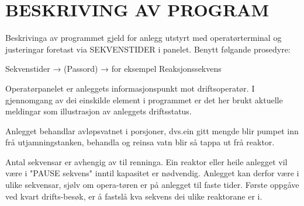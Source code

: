 \newpage
\section{BESKRIVING AV PROGRAM}
Beskrivinga av programmet gjeld for anlegg utstyrt med operatørterminal og justeringar foretast via SEKVENSTIDER i panelet. Benytt følgande prosedyre:

Sekvenstider → (Passord) → for eksempel Reaksjonssekvens 

Operatørpanelet er anleggets informasjonspunkt mot driftsoperatør. I gjennomgang av dei einskilde element i programmet er det her brukt aktuelle meldingar som illustrasjon av anleggets driftsstatus.

Anlegget behandlar avløpsvatnet i porsjoner, dvs.ein gitt mengde blir pumpet inn frå utjamningstanken, behandla og reinsa vatn blir så tappa ut frå reaktor.

Antal sekvensar er avhengig av til renninga. Ein reaktor eller heile anlegget vil være i "PAUSE sekvens" inntil kapasitet er nødvendig. 
Anlegget kan derfor være i ulike sekvensar, sjølv om opera-tøren er på anlegget til faste tider. Første oppgåve ved kvart drifts-besøk, er å fastslå kva sekvens dei ulike reaktorane er i.

